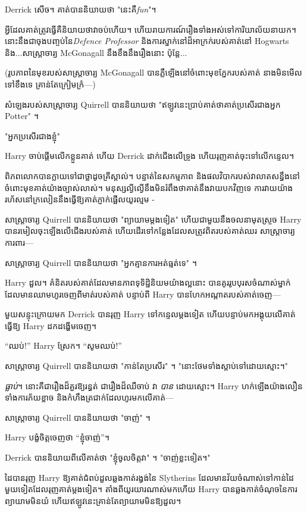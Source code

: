 {{{{{Derrick សើច។ គាត់បាននិយាយថា "នេះគឺ\emph{fun}"។

អ្វីដែលគាត់ត្រូវធ្វើគឺនិយាយថាវាចប់ហើយ។ ហើយ​រាយការណ៍​រឿង​ទាំងអស់​ទៅ​ការិយាល័យ​នាយក​។ នោះនឹងជាចុងបញ្ចប់នៃ\emph{Defence Professor} និងការស្នាក់នៅដ៏អាក្រក់របស់គាត់នៅ Hogwarts និង...សាស្រ្តាចារ្យ McGonagall នឹងខឹងនឹងរឿងនោះ ប៉ុន្តែ...

(រូបភាពនៃមុខរបស់សាស្រ្តាចារ្យ McGonagall បានភ្លឺឡើងនៅចំពោះមុខភ្នែករបស់គាត់ នាងមិនមើលទៅខឹងទេ គ្រាន់តែក្រៀមក្រំ—)

សំឡេងរបស់សាស្រ្តាចារ្យ Quirrell បាននិយាយថា "ឥឡូវនេះប្រាប់គាត់ថាគាត់ប្រសើរជាងអ្នក Potter" ។

"អ្នកប្រសើរជាងខ្ញុំ"

Harry ចាប់​ផ្តើម​លើក​ខ្លួន​គាត់ ហើយ Derrick ដាក់​ជើង​លើ​ទ្រូង ហើយ​រុញ​គាត់​ចុះ​ទៅ​លើ​កន្ទេល។

ពិភពលោកបានក្លាយទៅជាថ្លាដូចគ្រីស្តាល់។ បន្ទាត់នៃសកម្មភាព និងផលវិបាករបស់វាលាតសន្ធឹងនៅចំពោះមុខគាត់យ៉ាងច្បាស់លាស់។ មនុស្សល្ងីល្ងើនឹងមិនរំពឹងថាគាត់នឹងវាយបកវិញទេ ការវាយយ៉ាងរហ័សនៅក្រលៀននឹងធ្វើឱ្យគាត់ភ្ញាក់ផ្អើលយូរល្មម -

សាស្ត្រាចារ្យ Quirrell បាននិយាយថា "ព្យាយាមម្តងទៀត" ហើយជាមួយនឹងចលនាមុតស្រួច Harry បានរមៀលចុះឡើងលើជើងរបស់គាត់ ហើយដើរទៅកន្លែងដែលសត្រូវពិតរបស់គាត់ឈរ សាស្រ្តាចារ្យការពារ—

សាស្ត្រាចារ្យ Quirrell បាននិយាយថា "អ្នកគ្មានការអត់ធ្មត់ទេ" ។

Harry ដួល។ គំនិតរបស់គាត់ដែលមានភាពទុទិដ្ឋិនិយមយ៉ាងល្អនោះ បានគូររូបបុរសចំណាស់ម្នាក់ដែលមានឈាមហូរចេញពីមាត់របស់គាត់ បន្ទាប់ពី Harry បានហែកអណ្តាតរបស់គាត់ចេញ—

មួយសន្ទុះក្រោយមក Derrick បានរុញ Harry ទៅកន្ទេលម្តងទៀត ហើយបន្ទាប់មកអង្គុយលើគាត់ ធ្វើឱ្យ Harry ដកដង្ហើមចេញ។

“ឈប់!” Harry ស្រែក។ “សូមឈប់!”

សាស្រ្តាចារ្យ Quirrell បាននិយាយថា "កាន់តែប្រសើរ" ។ "នោះថែមទាំងស្តាប់ទៅដោយស្មោះ។"

\emph{ធ្លាប់}។ នោះគឺជារឿងដ៏គួរឱ្យរន្ធត់ ជារឿងដ៏ឈឺចាប់ វា \emph{បាន} ដោយស្មោះ។ Harry ហក់​ឡើង​យ៉ាង​លឿន ទាំង​ការ​ភ័យ​ខ្លាច និង​កំហឹង​ត្រជាក់​ដែល​ហូរ​មក​លើ​គាត់—

សាស្រ្តាចារ្យ Quirrell បាននិយាយថា "ចាញ់" ។

Harry បង្ខំ​ចិត្ត​ចេញ​ថា “ខ្ញុំ​ចាញ់”។

Derrick បាននិយាយពីលើគាត់ថា "ខ្ញុំចូលចិត្តវា" ។ "ចាញ់ខ្លះទៀត។"

\later

ដៃបានរុញ Harry ឱ្យគាត់ជំពប់ដួលឆ្លងកាត់រង្វង់នៃ Slytherins ដែលមានវ័យចំណាស់ទៅកាន់ដៃមួយទៀតដែលរុញគាត់ម្តងទៀត។ តាំងពីយូរយារណាស់មកហើយ Harry បានឆ្លងកាត់ចំណុចនៃការព្យាយាមមិនយំ ហើយឥឡូវនេះគ្រាន់តែព្យាយាមមិនឱ្យដួល។

}}}}}
